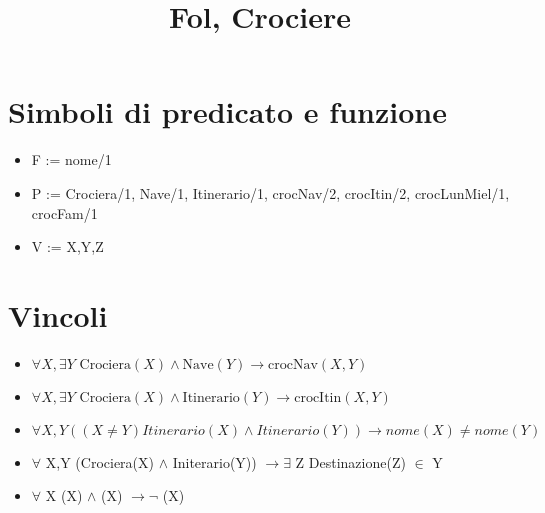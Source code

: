 \documentclass{article}
\begin{document}
\title{Fol, Crociere}
\maketitle

\section {Simboli di predicato e funzione}
\begin{itemize}
    \item F := {nome/1}
    \item P := {Crociera/1, Nave/1, Itinerario/1, crocNav/2, crocItin/2, crocLunMiel/1, crocFam/1}
    \item V := {X,Y,Z}
\end{itemize}


\section{Vincoli}
\begin{itemize}
    \item $\forall X, \exists Y \text{ Crociera}(X) \land \text{Nave}(Y) \rightarrow \text{crocNav}(X,Y)$
    \item $\forall X, \exists Y \text{ Crociera}(X) \land \text{Itinerario}(Y) \rightarrow \text{crocItin}(X,Y)$
    \item $\forall X,Y ((X \neq Y) Itinerario(X) \land Itinerario(Y)) \rightarrow nome(X) \neq nome(Y)$
    \item $\forall$ X,Y (Crociera(X) $\land$ Initerario(Y)) $\rightarrow \exists$ Z Destinazione(Z) $\in$ Y 
    \item $\forall$ X (X) $\land$ (X) $\rightarrow \neg$ (X)

\end{itemize}
\end{document}
